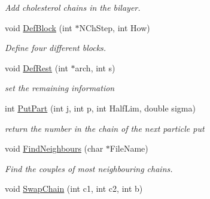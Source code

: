 \begin{DoxyCompactItemize}
\begin{DoxyCompactList}\small\item\em Add cholesterol chains in the bilayer. \end{DoxyCompactList}\item 
void \hyperlink{classVarData_a80a5e498e47cbb396e01f85c0392a274}{Def\+Block} (int $\ast$N\+Ch\+Step, int How)\hypertarget{classVarData_a80a5e498e47cbb396e01f85c0392a274}{}\label{classVarData_a80a5e498e47cbb396e01f85c0392a274}

\begin{DoxyCompactList}\small\item\em Define four different blocks. \end{DoxyCompactList}\item 
void \hyperlink{classVarData_ac45f6347eaccc5e30273270385d02119}{Def\+Rest} (int $\ast$arch, int s)\hypertarget{classVarData_ac45f6347eaccc5e30273270385d02119}{}\label{classVarData_ac45f6347eaccc5e30273270385d02119}

\begin{DoxyCompactList}\small\item\em set the remaining information \end{DoxyCompactList}\item 
int \hyperlink{classVarData_adbad2a97db5e9f837b2ff4e3ae58ec4d}{Put\+Part} (int j, int p, int Half\+Lim, double sigma)\hypertarget{classVarData_adbad2a97db5e9f837b2ff4e3ae58ec4d}{}\label{classVarData_adbad2a97db5e9f837b2ff4e3ae58ec4d}

\begin{DoxyCompactList}\small\item\em return the number in the chain of the next particle put \end{DoxyCompactList}\item 
void \hyperlink{classVarData_ac99cf9cb839b06e0c3e32ebb8d11d6be}{Find\+Neighbours} (char $\ast$File\+Name)\hypertarget{classVarData_ac99cf9cb839b06e0c3e32ebb8d11d6be}{}\label{classVarData_ac99cf9cb839b06e0c3e32ebb8d11d6be}

\begin{DoxyCompactList}\small\item\em Find the couples of most neighbouring chains. \end{DoxyCompactList}\item 
void \hyperlink{classVarData_a9b8f7a0f3ed7c785a4da59c58781d050}{Swap\+Chain} (int c1, int c2, int b)\hypertarget{classVarData_a9b8f7a0f3ed7c785a4da59c58781d050}{}\label{classVarData_a9b8f7a0f3ed7c785a4da59c58781d050}


\end{DoxyCompactItemize}
